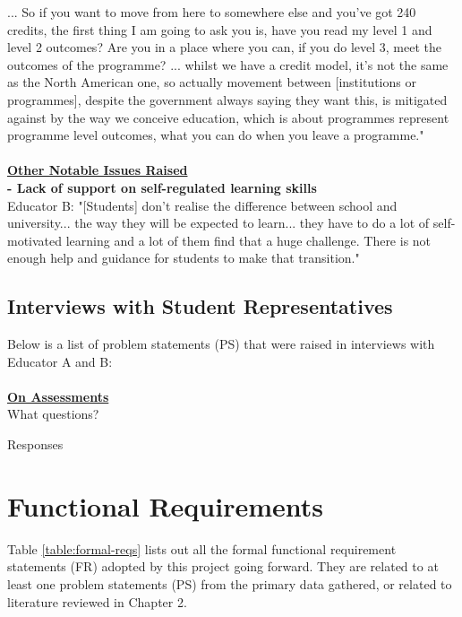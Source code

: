 ... So if you want to move from here to somewhere else and you’ve got 240 credits, the first thing I am 
going to ask you is, have you read my level 1 and level 2 outcomes? Are you in a place where you can, 
if you do level 3, meet the outcomes of the programme? ... whilst we have a credit model, it’s not the 
same as the North American one, so actually movement between [institutions or programmes], despite the 
government always saying they want this, is mitigated against by the way we conceive education, 
which is about programmes represent programme level outcomes, what you can do when you leave a programme."
\\\\
\underline{\textbf{Other Notable Issues Raised}}
\\
\textbf{- Lack of support on self-regulated learning skills}\\
Educator B: "[Students] don't realise the difference between school and university... the way they will
be expected to learn... they have to do a lot of self-motivated learning and a lot of them find that a 
huge challenge. There is not enough help and guidance for students to make that transition."

\subsection{Interviews with Student Representatives}

Below is a list of problem statements (PS) that were raised in interviews with Educator A and B:\\
\\
\underline{\textbf{On Assessments}}
\\
What questions?

Responses

\section{Functional Requirements}

Table \ref{table:formal-reqs} lists out all the formal functional requirement statements (FR) adopted by this 
project going forward. They are related to at least one problem statements (PS) from the primary data 
gathered, or related to literature reviewed in Chapter 2.

